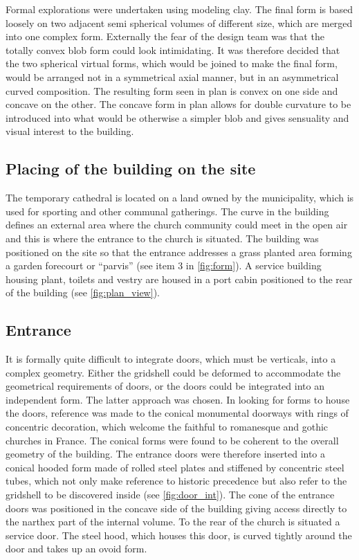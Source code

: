 Formal explorations were undertaken using modeling clay. The final form is based loosely on two adjacent semi spherical volumes of different size, which are merged into one complex form. Externally the fear of the design team was that the totally convex blob form could look intimidating. It was therefore decided that the two spherical virtual forms, which would be joined to make the final form, would be arranged not in a symmetrical axial manner, but in an asymmetrical curved composition. The resulting form seen in plan is convex on one side and concave on the other. The concave form in plan allows for double curvature to be introduced into what would be otherwise a simpler blob and gives sensuality and visual interest to the building.

\subsection{Placing of the building on the site}
The temporary cathedral is located on a land owned by the municipality, which is used for sporting and other communal gatherings. The curve in the building defines an external area where the church community could meet in the open air and this is where the entrance to the church is situated. The building was positioned on the site so that the entrance addresses a grass planted area forming a garden forecourt or “parvis” (see item 3 in \cref{fig:form}). A service building housing plant, toilets and vestry are housed in a port cabin positioned to the rear of the building (see \cref{fig:plan_view}).

\subsection{Entrance}
It is formally quite difficult to integrate doors, which must be verticals, into a complex geometry. Either the gridshell could be deformed to accommodate the geometrical requirements of doors, or the doors could be integrated into an independent form. The latter approach was chosen. In looking for forms to house the doors, reference was made to the conical monumental doorways with rings of concentric decoration, which welcome the faithful to romanesque and gothic churches in France. The conical forms were found to be coherent to the overall geometry of the building. The entrance doors were therefore inserted into a conical hooded form made of rolled steel plates and stiffened by concentric steel tubes, which not only make reference to historic precedence but also refer to the gridshell to be discovered inside (see \cref{fig:door_int}). The cone of the entrance doors was positioned in the concave side of the building giving access directly to the narthex part of the internal volume. To the rear of the church is situated a service door. The steel hood, which houses this door, is curved tightly around the door and takes up an ovoid form.

